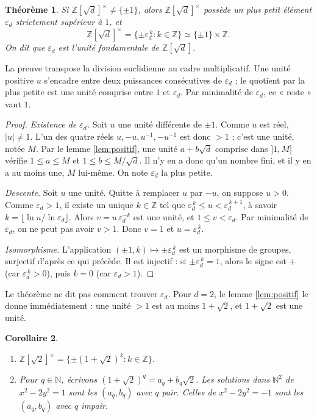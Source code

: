 \documentclass[11pt,a4paper]{article}
\theoremstyle{plain}
\newtheorem{theoreme}{Théorème}[section]
\newtheorem{corollaire}[theoreme]{Corollaire}
\theoremstyle{definition}
\theoremstyle{remark}
\newcommand{\N}{\mathbb{N}}
\newcommand{\Z}{\mathbb{Z}}
\begin{document}
\begin{theoreme}\label{thm:unites}
Si $\Z[\sqrt d]^\times\neq\{\pm1\}$, alors $\Z[\sqrt d]^\times$ possède un plus petit élément $\varepsilon_d$ strictement supérieur à $1$, et
\[
  \Z[\sqrt d]^\times=\{\pm\varepsilon_d^{\,k} : k\in\Z\}\simeq\{\pm1\}\times\Z .
\]
On dit que $\varepsilon_d$ est l'\emph{unité fondamentale} de $\Z[\sqrt d]$.
\end{theoreme}

La preuve transpose la division euclidienne au cadre multiplicatif. Une unité positive $u$ s'encadre entre deux puissances consécutives de $\varepsilon_d$ ; le quotient par la plus petite est une unité comprise entre $1$ et $\varepsilon_d$. Par minimalité de $\varepsilon_d$, ce « reste » vaut $1$.

\begin{proof}
\emph{Existence de $\varepsilon_d$.} Soit $u$ une unité différente de $\pm1$. Comme $u$ est réel, $|u|\neq1$. L'un des quatre réels $u,-u,u^{-1},-u^{-1}$ est donc $>1$ ; c'est une unité, notée $M$. Par le lemme \ref{lem:positif}, une unité $a+b\sqrt d$ comprise dans $]1,M]$ vérifie $1\leq a\leq M$ et $1\leq b\leq M/\sqrt d$. Il n'y en a donc qu'un nombre fini, et il y en a au moins une, $M$ lui-même. On note $\varepsilon_d$ la plus petite.

\emph{Descente.} Soit $u$ une unité. Quitte à remplacer $u$ par $-u$, on suppose $u>0$. Comme $\varepsilon_d>1$, il existe un unique $k\in\Z$ tel que $\varepsilon_d^{\,k}\leq u<\varepsilon_d^{\,k+1}$, à savoir $k=\lfloor\ln u/\ln\varepsilon_d\rfloor$. Alors $v=u\,\varepsilon_d^{-k}$ est une unité, et $1\leq v<\varepsilon_d$. Par minimalité de $\varepsilon_d$, on ne peut pas avoir $v>1$. Donc $v=1$ et $u=\varepsilon_d^{\,k}$.

\emph{Isomorphisme.} L'application $(\pm1,k)\mapsto\pm\varepsilon_d^{\,k}$ est un morphisme de groupes, surjectif d'après ce qui précède. Il est injectif : si $\pm\varepsilon_d^{\,k}=1$, alors le signe est $+$ (car $\varepsilon_d^{\,k}>0$), puis $k=0$ (car $\varepsilon_d>1$).
\end{proof}

Le théorème ne dit pas comment trouver $\varepsilon_d$. Pour $d=2$, le lemme \ref{lem:positif} le donne immédiatement : une unité $>1$ est au moins $1+\sqrt2$, et $1+\sqrt2$ est une unité.

\begin{corollaire}\label{cor:z2}
\begin{enumerate}[nosep]
\item $\Z[\sqrt2]^\times=\{\pm(1+\sqrt2)^k : k\in\Z\}$.
\item Pour $q\in\N$, écrivons $(1+\sqrt2)^q=a_q+b_q\sqrt2$. Les solutions dans $\N^2$ de $x^2-2y^2=1$ sont les $(a_q,b_q)$ avec $q$ pair. Celles de $x^2-2y^2=-1$ sont les $(a_q,b_q)$ avec $q$ impair.
\end{enumerate}
\end{corollaire}
\end{document}

